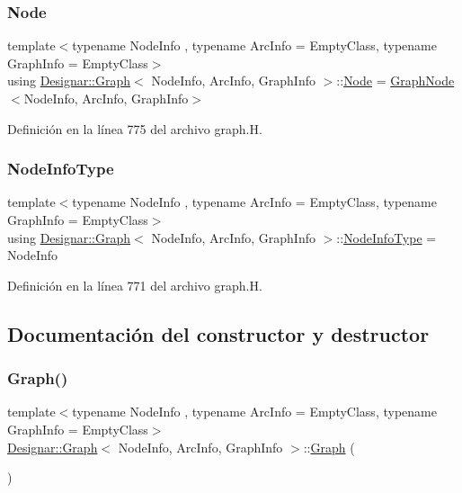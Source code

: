 \subsubsection{\texorpdfstring{Node}{Node}}
{\footnotesize\ttfamily template$<$typename Node\+Info , typename Arc\+Info  = Empty\+Class, typename Graph\+Info  = Empty\+Class$>$ \\
using \hyperlink{class_designar_1_1_graph}{Designar\+::\+Graph}$<$ Node\+Info, Arc\+Info, Graph\+Info $>$\+::\hyperlink{class_designar_1_1_graph_a5dfc7dba9d092ac489c72e40390c37d0}{Node} =  \hyperlink{class_designar_1_1_graph_node}{Graph\+Node}$<$Node\+Info, Arc\+Info, Graph\+Info$>$}



Definición en la línea 775 del archivo graph.\+H.

\mbox{\label{class_designar_1_1_graph_a31ac58ee9562d1695e63449318577032}} 
\subsubsection{\texorpdfstring{Node\+Info\+Type}{NodeInfoType}}
{\footnotesize\ttfamily template$<$typename Node\+Info , typename Arc\+Info  = Empty\+Class, typename Graph\+Info  = Empty\+Class$>$ \\
using \hyperlink{class_designar_1_1_graph}{Designar\+::\+Graph}$<$ Node\+Info, Arc\+Info, Graph\+Info $>$\+::\hyperlink{class_designar_1_1_graph_a31ac58ee9562d1695e63449318577032}{Node\+Info\+Type} =  Node\+Info}



Definición en la línea 771 del archivo graph.\+H.



\subsection{Documentación del constructor y destructor}
\mbox{\label{class_designar_1_1_graph_a606f7514b8036679207da8a09ddfa6bd}} 
\subsubsection{\texorpdfstring{Graph()}{Graph()}\hspace{0.1cm}{\footnotesize\ttfamily [1/5]}}
{\footnotesize\ttfamily template$<$typename Node\+Info , typename Arc\+Info  = Empty\+Class, typename Graph\+Info  = Empty\+Class$>$ \\
\hyperlink{class_designar_1_1_graph}{Designar\+::\+Graph}$<$ Node\+Info, Arc\+Info, Graph\+Info $>$\+::\hyperlink{class_designar_1_1_graph}{Graph} (\begin{DoxyParamCaption}{ }\end{DoxyParamCaption})\hspace{0.3cm}{\ttfamily [inline]}}



